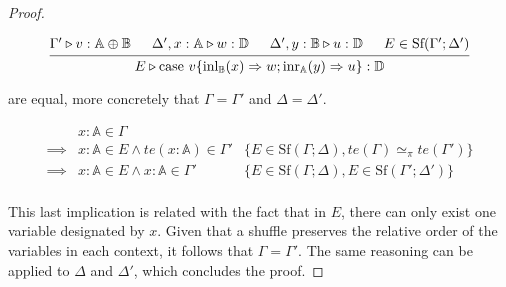 \documentclass[10pt,a4paper]{amsart}
\theoremstyle{definition}
\theoremstyle{definition}
\theoremstyle{definition}
\theoremstyle{definition}
\theoremstyle{definition}
\theoremstyle{definition}
\begin{document}
\begin{proof}
\begin{figure} [H]
  \begin{equation*}
  \begin{aligned}
    \begin{prooftree}
        \hypo{\Gamma' \triangleright v: \mathbb{A} \oplus \mathbb{B}}
        \hypo{\Delta', x: \mathbb{A} \triangleright w: \mathbb{D}}
        \hypo{\Delta', y: \mathbb{B} \triangleright u: \mathbb{D}}
        \hypo{E \in \text{Sf}(\Gamma'; \Delta')}
        \infer4[]{E \triangleright \text{case } v \{\text{inl}_{\mathbb{B}}(x) \Rightarrow w ; \text{inr}_{\mathbb{A}}(y) \Rightarrow u\}: \mathbb{D}}
        \end{prooftree}
  \end{aligned}
  \end{equation*}
  \end{figure}

are equal, more concretely that $\Gamma = \Gamma'$ and $\Delta = \Delta'$. 

\begin{align*}
  & x: \mathbb{A}  \in \Gamma & \\
  \implies & x: \mathbb{A}  \in E \land   te(x:\mathbb{A}) \in \Gamma'  & \{E \in \text{Sf}(\Gamma;\Delta), te(\Gamma) \simeq_{\pi}  te(\Gamma') \} \\
  \implies & x: \mathbb{A}  \in E \land  x:\mathbb{A} \in \Gamma'  & \{ E \in \text{Sf}(\Gamma;\Delta),E \in \text{Sf}(\Gamma';\Delta') \} \\
\end{align*}

This last implication is related with the fact that in $E$, there can only exist one  variable designated by $x$. Given that a shuffle preserves the relative order of the variables in each context, it follows that $\Gamma = \Gamma'$. The same reasoning can be applied to $\Delta$ and $\Delta'$, which concludes the proof. 


  \end{proof}

 

\end{document}
